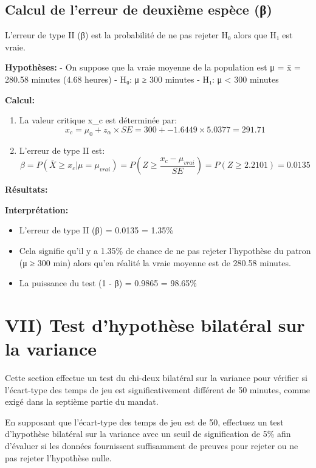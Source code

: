     \subsection{Calcul de l'erreur de deuxième espèce
(β)}\label{calcul-de-lerreur-de-deuxiuxe8me-espuxe8ce-ux3b2}

L'erreur de type II (β) est la probabilité de ne pas rejeter H₀ alors
que H₁ est vraie.

\textbf{Hypothèses:} - On suppose que la vraie moyenne de la population
est μ = x̄ = 280.58 minutes (4.68 heures) - H₀: μ ≥ 300 minutes - H₁: μ
\textless{} 300 minutes

\textbf{Calcul:}

\begin{enumerate}
\def\labelenumi{\arabic{enumi}.}
\item
  La valeur critique x\_c est déterminée par: \[
  x_c = \mu_0 + z_\alpha \times SE = 300 + -1.6449 \times 5.0377 = 291.71
  \]
\item
  L'erreur de type II est: \[
  \beta = P(\bar{X} \geq x_c | \mu = \mu_{vrai}) = P\left(Z \geq \frac{x_c - \mu_{vrai}}{SE}\right) = P(Z \geq 2.2101) = 0.0135
  \]
\end{enumerate}

\textbf{Résultats:}

\textbf{Interprétation:}

\begin{itemize}
\tightlist
\item
  L'erreur de type II (β) = 0.0135 = 1.35\%
\item
  Cela signifie qu'il y a 1.35\% de chance de ne pas rejeter l'hypothèse
  du patron (μ ≥ 300 min) alors qu'en réalité la vraie moyenne est de
  280.58 minutes.
\item
  La puissance du test (1 - β) = 0.9865 = 98.65\%
\end{itemize}



    \section{VII) Test d'hypothèse bilatéral sur la
variance}\label{vii-test-dhypothuxe8se-bilatuxe9ral-sur-la-variance}

Cette section effectue un test du chi-deux bilatéral sur la variance
pour vérifier si l'écart-type des temps de jeu est significativement
différent de 50 minutes, comme exigé dans la septième partie du mandat.

En supposant que l'écart-type des temps de jeu est de 50, effectuez un
test d'hypothèse bilatéral sur la variance avec un seuil de
signification de 5\% afin d'évaluer si les données fournissent
suffisamment de preuves pour rejeter ou ne pas rejeter l'hypothèse
nulle.

